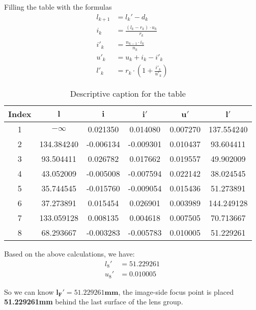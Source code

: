 \documentclass{article}
\begin{document}
Filling the table with the formulas
\begin{align}
    l_{k+1} & = l_k'-d_k                       \\
    i_k     & = \frac{(l_k-r_k)\cdot u_k}{r_k} \\
    i'_k    & = \frac{n_{k-1}\cdot i_k}{n_k}   \\
    u'_k    & = u_k+i_k-i'_k                   \\
    l'_k    & = r_k\cdot(1+\frac{i'_k}{u'_k})
\end{align}


\begin{table}[H]
    \centering
    \begin{tabular}{cccccc}
        \hline
        \textbf{Index} & $\mathbf{l}$ & $\mathbf{i}$ & $\mathbf{i'}$ & $\mathbf{u'}$ & $\mathbf{l'}$ \\
        \hline
        1              & $-\infty$    & 0.021350     & 0.014080      & 0.007270      & 137.554240    \\
        2              & 134.384240   & -0.006134    & -0.009301     & 0.010437      & 93.604411     \\
        3              & 93.504411    & 0.026782     & 0.017662      & 0.019557      & 49.902009     \\
        4              & 43.052009    & -0.005008    & -0.007594     & 0.022142      & 38.024545     \\
        5              & 35.744545    & -0.015760    & -0.009054     & 0.015436      & 51.273891     \\
        6              & 37.273891    & 0.015454     & 0.026901      & 0.003989      & 144.249128    \\
        7              & 133.059128   & 0.008135     & 0.004618      & 0.007505      & 70.713667     \\
        8              & 68.293667    & -0.003283    & -0.005783     & 0.010005      & 51.229261     \\
        \hline
    \end{tabular}
    \caption{Descriptive caption for the table}
\end{table}



Based on the above calculations, we have:
\begin{align*}
    l_8' & = 51.229261 \\
    u_8' & = 0.010005
\end{align*}

So we can know $\mathbf{l_F' = 51.229261mm}$, the image-side focus point is placed \textbf{51.229261mm} behind the last surface of the lens group.
\end{document}
